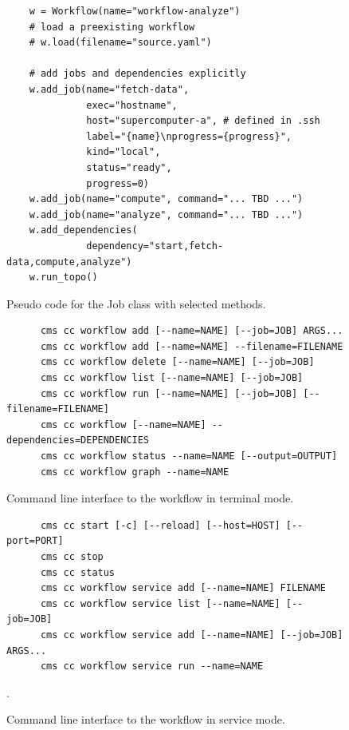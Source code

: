 \begin{figure}[htb]
\begin{verbatim}
    w = Workflow(name="workflow-analyze")
    # load a preexisting workflow
    # w.load(filename="source.yaml")
    
    # add jobs and dependencies explicitly
    w.add_job(name="fetch-data",
              exec="hostname",
              host="supercomputer-a", # defined in .ssh
              label="{name}\nprogress={progress}",
              kind="local",
              status="ready",
              progress=0)
    w.add_job(name="compute", command="... TBD ...")
    w.add_job(name="analyze", command="... TBD ...")
    w.add_dependencies(
              dependency="start,fetch-data,compute,analyze")
    w.run_topo()
\end{verbatim}
\caption{Pseudo code for the Job class with selected methods.}
\label{fig:code-workflow-example}

\bigskip

\begin{verbatim}
      cms cc workflow add [--name=NAME] [--job=JOB] ARGS...
      cms cc workflow add [--name=NAME] --filename=FILENAME
      cms cc workflow delete [--name=NAME] [--job=JOB]
      cms cc workflow list [--name=NAME] [--job=JOB]
      cms cc workflow run [--name=NAME] [--job=JOB] [--filename=FILENAME]
      cms cc workflow [--name=NAME] --dependencies=DEPENDENCIES
      cms cc workflow status --name=NAME [--output=OUTPUT]
      cms cc workflow graph --name=NAME
\end{verbatim}
\caption{Command line interface to the workflow in terminal mode.}
\label{fig:code-workflow-commandline}

\bigskip

\begin{verbatim}
      cms cc start [-c] [--reload] [--host=HOST] [--port=PORT]
      cms cc stop
      cms cc status
      cms cc workflow service add [--name=NAME] FILENAME
      cms cc workflow service list [--name=NAME] [--job=JOB]
      cms cc workflow service add [--name=NAME] [--job=JOB] ARGS...
      cms cc workflow service run --name=NAME
\end{verbatim}
\caption{Command line interface to the workflow in service mode.}
\label{fig:code-workflow-service-commandline}.



\end{figure}
